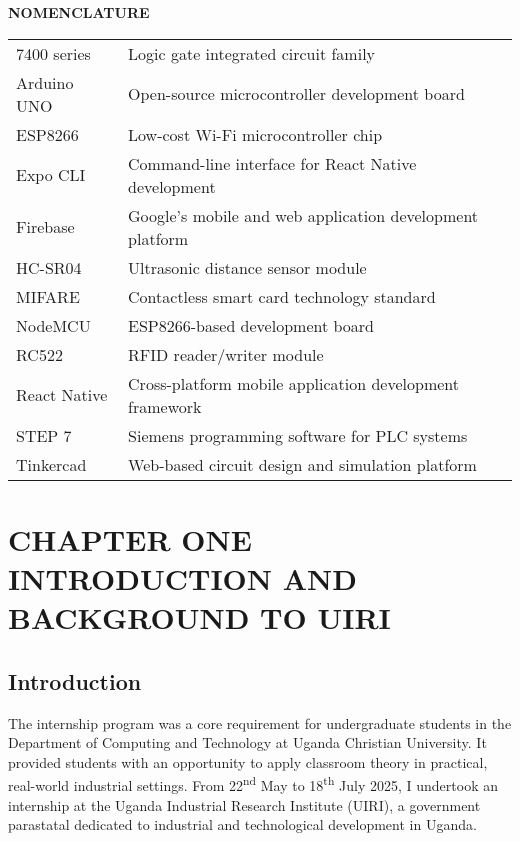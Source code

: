 \documentclass[12pt,a4paper]{report}
\begin{document}
\newpage

{\fontsize{14}{16.8}\selectfont\bfseries\centering NOMENCLATURE\par}
\vspace{10pt}

\begin{tabular}{ll}
7400 series & Logic gate integrated circuit family \\
Arduino UNO & Open-source microcontroller development board \\
ESP8266 & Low-cost Wi-Fi microcontroller chip \\
Expo CLI & Command-line interface for React Native development \\
Firebase & Google's mobile and web application development platform \\
HC-SR04 & Ultrasonic distance sensor module \\
MIFARE & Contactless smart card technology standard \\
NodeMCU & ESP8266-based development board \\
RC522 & RFID reader/writer module \\
React Native & Cross-platform mobile application development framework \\
STEP 7 & Siemens programming software for PLC systems \\
Tinkercad & Web-based circuit design and simulation platform \\
\end{tabular}

\newpage


\chapter[CHAPTER ONE INTRODUCTION AND BACKGROUND TO UIRI]{CHAPTER ONE \\INTRODUCTION AND BACKGROUND TO UIRI}

\section{Introduction}
\noindent The internship program was a core requirement for undergraduate students in the Department of Computing and Technology at Uganda Christian University. It provided students with an opportunity to apply classroom theory in practical, real-world industrial settings. From 22\textsuperscript{nd} May to 18\textsuperscript{th} July 2025, I undertook an internship at the Uganda Industrial Research Institute (UIRI), a government parastatal dedicated to industrial and technological development in Uganda.
\end{document}

